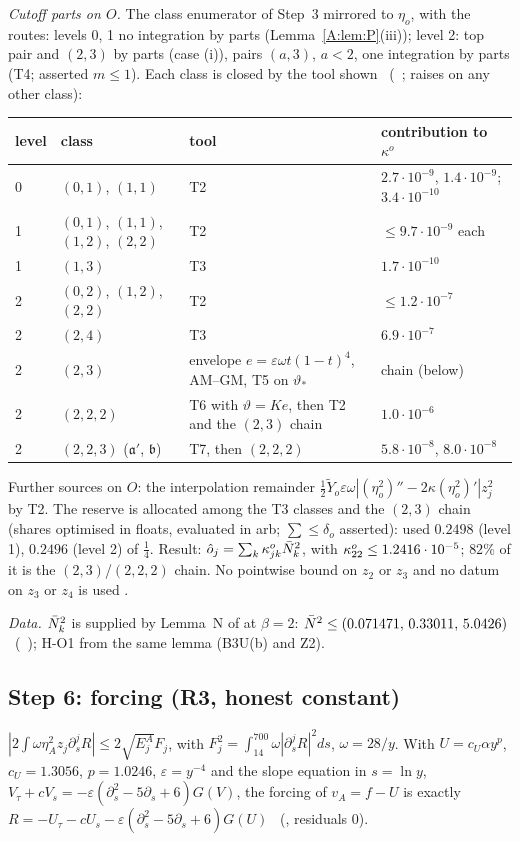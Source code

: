 \documentclass[11pt]{article}
\begin{document}
\emph{Cutoff parts on $O$.} The class enumerator of Step~3 mirrored to $\eta_o$, with the routes: levels 0, 1 no integration by parts (Lemma~\ref{A:lem:P}(iii)); level 2: top pair and $(2,3)$ by parts (case (i)), pairs $(a,3)$, $a<2$, one integration by parts (T4; asserted $m\le1$). Each class is closed by the tool shown \tC\ (\SA\ ;  raises on any other class):
\begin{center}\small\begin{tabular}{@{}llll@{}}\toprule level & class & tool & contribution to $\kappa^o$\\\midrule
0 & $(0,1)$, $(1,1)$ & T2 & $2.7\cdot10^{-9}$, $1.4\cdot10^{-9}$; $3.4\cdot10^{-10}$\\
1 & $(0,1)$, $(1,1)$, $(1,2)$, $(2,2)$ & T2 & $\le9.7\cdot10^{-9}$ each\\
1 & $(1,3)$ & T3 & $1.7\cdot10^{-10}$\\
2 & $(0,2)$, $(1,2)$, $(2,2)$ & T2 & $\le1.2\cdot10^{-7}$\\
2 & $(2,4)$ & T3 & $6.9\cdot10^{-7}$\\
2 & $(2,3)$ & envelope $e=\varepsilon\omega t(1-t)^4$, AM--GM, T5 on $\vartheta_*$ & chain (below)\\
2 & $(2,2,2)$ & T6 with $\vartheta=Ke$, then T2 and the $(2,3)$ chain & $1.0\cdot10^{-6}$\\
2 & $(2,2,3)$ ($\mathfrak a'$, $\mathfrak b$) & T7, then $(2,2,2)$ & $5.8\cdot10^{-8}$, $8.0\cdot10^{-8}$\\\bottomrule\end{tabular}\end{center}
Further sources on $O$: the interpolation remainder $\frac12\tilde Y_o\varepsilon\omega|(\eta_o^2)''-2\kappa(\eta_o^2)'|z_j^2$ by T2. The reserve is allocated among the T3 classes and the $(2,3)$ chain (shares optimised in floats, evaluated in arb; $\sum\le\delta_o$ asserted): used $0.2498$ (level 1), $0.2496$ (level 2) of $\frac14$. Result: $\hat o_j=\sum_k\kappa^o_{jk}\bar N_k^2$, with $\kappa^o_{22}\le1.2416\cdot10^{-5}$; $82\%$ of it is the $(2,3)$/$(2,2,2)$ chain. No pointwise bound on $z_2$ or $z_3$ and no datum on $z_3$ or $z_4$ is used \tC.

\emph{Data.} $\bar N_k^2$ is supplied by Lemma~N of  at $\beta=2$: $\bar N^2\le(0.071471,\,0.33011,\,5.0426)$ \tC\ (\SU\ ); H-O1 from the same lemma (B3U(b) and Z2).

\subsection{Step 6: forcing (R3, honest constant)}\label{A:sec:forcing}
$|2\int\omega\eta_A^2z_j\partial_s^jR|\le2\sqrt{E^A_j}F_j$, with $F_j^2=\int_{14}^{700}\omega|\partial_s^jR|^2ds$, $\omega=28/y$. With $U=c_U\alpha y^p$, $c_U=1.3056$, $p=1.0246$, $\varepsilon=y^{-4}$ and the slope equation in $s=\ln y$, $V_\tau+cV_s=-\varepsilon(\partial_s^2-5\partial_s+6)G(V)$, the forcing of $v_A=f-U$ is exactly $R=-U_\tau-cU_s-\varepsilon(\partial_s^2-5\partial_s+6)G(U)$ \tS\ (, residuals 0).
\end{document}
